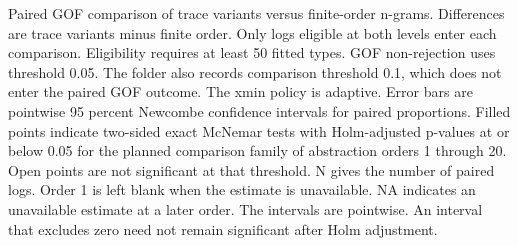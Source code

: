 Paired GOF comparison of trace variants versus finite-order n-grams. Differences are trace variants minus finite order. Only logs eligible at both levels enter each comparison. Eligibility requires at least 50 fitted types. GOF non-rejection uses threshold 0.05. The folder also records comparison threshold 0.1, which does not enter the paired GOF outcome. The xmin policy is adaptive. Error bars are pointwise 95 percent Newcombe confidence intervals for paired proportions. Filled points indicate two-sided exact McNemar tests with Holm-adjusted p-values at or below 0.05 for the planned comparison family of abstraction orders 1 through 20. Open points are not significant at that threshold. N gives the number of paired logs. Order 1 is left blank when the estimate is unavailable. NA indicates an unavailable estimate at a later order. The intervals are pointwise. An interval that excludes zero need not remain significant after Holm adjustment.
